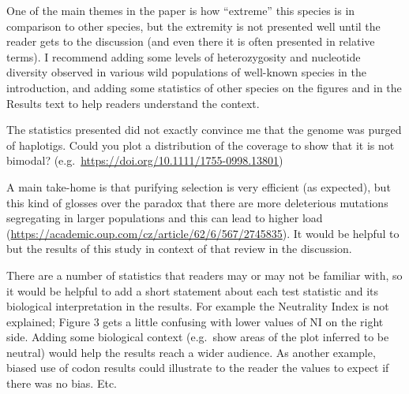 \begin{point}{} %
One of the main themes in the paper is how ``extreme'' this species is in
comparison to other species, but the extremity is not presented well
until the reader gets to the discussion (and even there it is often
presented in relative terms). I recommend adding some levels of
heterozygosity and nucleotide diversity observed in various wild
populations of well-known species in the introduction, and adding some
statistics of other species on the figures and in the Results text to
help readers understand the context.
\end{point}


\begin{point}{} %
The statistics presented did not exactly convince me that the genome was
purged of haplotigs. Could you plot a distribution of the coverage to
show that it is not bimodal? (e.g.\
\url{https://doi.org/10.1111/1755-0998.13801})
\end{point}


\begin{point}{} %
A main take-home is that purifying selection is very efficient (as
expected), but this kind of glosses over the paradox that there are more
deleterious mutations segregating in larger populations and this can lead
to higher load (\url{https://academic.oup.com/cz/article/62/6/567/2745835}).
It would be helpful to but the results of this study in context of that
review in the discussion.
\end{point}


\begin{point}{} %
There are a number of statistics that readers may or may not be familiar
with, so it would be helpful to add a short statement about each test
statistic and its biological interpretation in the results. For example
the Neutrality Index is not explained; Figure 3 gets a little confusing
with lower values of NI on the right side. Adding some biological context
(e.g.\ show areas of the plot inferred to be neutral) would help the
results reach a wider audience. As another example, biased use of codon
results could illustrate to the reader the values to expect if there was
no bias. Etc.
\end{point}

